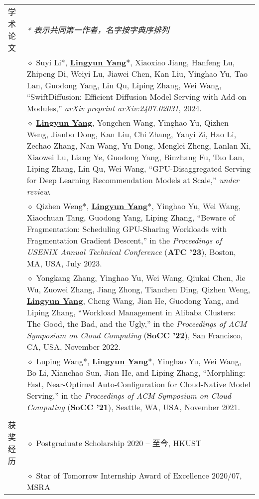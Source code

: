 \documentclass[letterpaper, 10pt]{article}
\begin{document}
\begin{longtable}{p{1.3in}p{5.0in}}
\nohyphens{\textsc{学术论文}}
& \textit{* 表示共同第一作者，名字按字典序排列} \\
& $\diamond$ Suyi Li*, \textbf{\underline{Lingyun Yang}}*, Xiaoxiao Jiang, Hanfeng Lu, Zhipeng Di, Weiyi Lu, Jiawei Chen, Kan Liu, Yinghao Yu, Tao Lan, Guodong Yang, Lin Qu, Liping Zhang, Wei Wang, “SwiftDiffusion: Efficient Diffusion Model Serving with Add-on Modules,” \textit{arXiv preprint arXiv:2407.02031}, 2024. \\
& $\diamond$ \textbf{\underline{Lingyun Yang}}, Yongchen Wang, Yinghao Yu, Qizhen Weng, Jianbo Dong, Kan Liu, Chi Zhang, Yanyi Zi, Hao Li, Zechao Zhang, Nan Wang, Yu Dong, Menglei Zheng, Lanlan Xi, Xiaowei Lu, Liang Ye, Guodong Yang, Binzhang Fu, Tao Lan, Liping Zhang, Lin Qu, Wei Wang, “GPU-Disaggregated Serving for Deep Learning Recommendation Models at Scale,” \textit{under review}. \\
& $\diamond$ Qizhen Weng*, \textbf{\underline{Lingyun Yang}}*, Yinghao Yu, Wei Wang, Xiaochuan Tang, Guodong Yang, Liping Zhang, “Beware of Fragmentation: Scheduling GPU-Sharing Workloads with Fragmentation Gradient Descent,” in the \textit{Proceedings of USENIX Annual Technical Conference} (\textbf{ATC '23}), Boston, MA, USA, July 2023. \\
& $\diamond$ Yongkang Zhang, Yinghao Yu, Wei Wang, Qiukai Chen, Jie Wu, Zuowei Zhang, Jiang Zhong, Tianchen Ding, Qizhen Weng, \textbf{\underline{Lingyun Yang}}, Cheng Wang, Jian He, Guodong Yang, and Liping Zhang, “Workload Management in Alibaba Clusters: The Good, the Bad, and the Ugly,” in the \textit{Proceedings of ACM Symposium on Cloud Computing} (\textbf{SoCC '22}), San Francisco, CA, USA, November 2022. \\
& $\diamond$ Luping Wang*, \textbf{\underline{Lingyun Yang}}*, Yinghao Yu, Wei Wang, Bo Li, Xianchao Sun, Jian He, and Liping Zhang, “Morphling: Fast, Near-Optimal Auto-Configuration for Cloud-Native Model Serving,” in the \textit{Proceedings of ACM Symposium on Cloud Computing} (\textbf{SoCC '21}), Seattle, WA, USA, November 2021. \\
& \\

{获奖经历}
& $\diamond$ Postgraduate Scholarship \hfill 2020 -- 至今, HKUST \\

& $\diamond$ Star of Tomorrow Internship Award of Excellence \hfill 2020/07, MSRA \\


\end{longtable}
\end{document}
